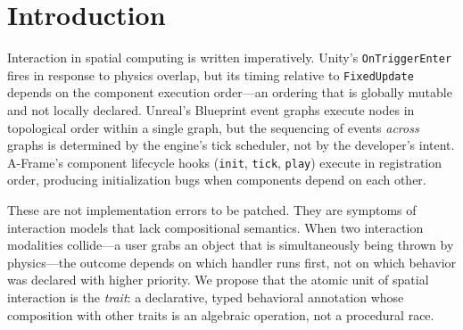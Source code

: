 \documentclass[sigconf,nonacm]{acmart}
\begin{document}
\section{Introduction}
\label{sec:intro}

Interaction in spatial computing is written imperatively.
Unity's \texttt{OnTriggerEnter} fires in response to physics
overlap, but its timing relative to \texttt{FixedUpdate}
depends on the component execution order---an ordering that
is globally mutable and not locally declared. Unreal's
Blueprint event graphs execute nodes in topological order
within a single graph, but the sequencing of events
\emph{across} graphs is determined by the engine's tick
scheduler, not by the developer's intent. A-Frame's component
lifecycle hooks (\texttt{init}, \texttt{tick}, \texttt{play})
execute in registration order, producing initialization bugs
when components depend on each other.

These are not implementation errors to be patched. They are
symptoms of interaction models that lack compositional
semantics. When two interaction modalities collide---a user
grabs an object that is simultaneously being thrown by
physics---the outcome depends on which handler runs first,
not on which behavior was declared with higher priority. We
propose that the atomic unit of spatial interaction is the
\emph{trait}: a declarative, typed behavioral annotation
whose composition with other traits is an algebraic
operation, not a procedural race.
\end{document}
